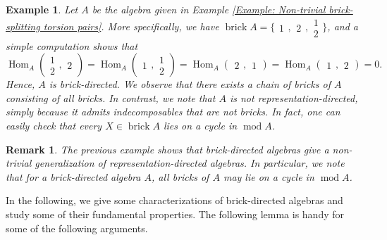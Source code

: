 \documentclass{amsart}
\theoremstyle{thmstyle}
\theoremstyle{exstyle}
\newtheorem{example}[thm]{Example}
\theoremstyle{defstyle}
\theoremstyle{remstyle}
\newtheorem{remark}[thm]{Remark}
\theoremstyle{remstyle}
\newcommand{\Hom}{\operatorname{Hom}}
\DeclareMathOperator*{\modu}{mod}
\DeclareMathOperator*{\brick}{brick}
\begin{document}
\begin{example}
Let $A$ be the algebra given in Example \ref{Example: Non-trivial brick-splitting torsion pairs}. More specifically, we have $\brick A=\{{\begin{smallmatrix} 1\end{smallmatrix}}, {\begin{smallmatrix} 2\end{smallmatrix}}, {\begin{smallmatrix} 1\\2\end{smallmatrix}} \}$, and a simple computation shows that 
$$\Hom_A({\begin{smallmatrix} 1\\2\end{smallmatrix}},{\begin{smallmatrix} 2\end{smallmatrix}})=\Hom_A({\begin{smallmatrix} 1\end{smallmatrix}},{\begin{smallmatrix} 1\\2\end{smallmatrix}})=\Hom_A({\begin{smallmatrix} 2\end{smallmatrix}},{\begin{smallmatrix} 1\end{smallmatrix}})=\Hom_A({\begin{smallmatrix} 1\end{smallmatrix}},{\begin{smallmatrix} 2\end{smallmatrix}})=0.$$
Hence, $A$ is brick-directed. We observe that there exists a chain of bricks of $A$ consisting of all bricks. 
In contrast, we note that $A$ is not representation-directed, simply because it admits indecomposables that are not bricks. In fact, one can easily check that every $X \in \brick A$ lies on a cycle in $\modu A$.
\end{example}

\begin{remark}
The previous example shows that brick-directed algebras give a non-trivial generalization of representation-directed algebras. In particular, we note that for a brick-directed algebra $A$, all bricks of $A$ may lie on a cycle in $\modu A$.
\end{remark}

In the following, we give some characterizations of brick-directed algebras and study some of their fundamental properties. 
The following lemma is handy for some of the following arguments. 
\end{document}
